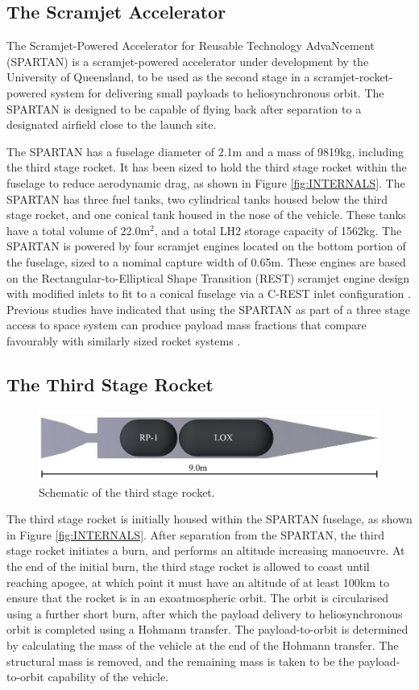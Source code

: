 \documentclass[]{aiaa-tc}
\begin{document}
\subsection{The Scramjet Accelerator}
The Scramjet-Powered Accelerator for Reusable Technology AdvaNcement (SPARTAN) is a scramjet-powered accelerator under development by the University of Queensland, to be used as the second stage in a scramjet-rocket-powered system for delivering small payloads to heliosynchronous orbit\cite{Preller2017}. The SPARTAN is designed to be capable of flying back after separation to a designated airfield close to the launch site.  

The SPARTAN has a fuselage diameter of 2.1m and a mass of 9819kg, including the third stage rocket. It has been sized to hold the third stage rocket within the fuselage to reduce aerodynamic drag, as shown in Figure \ref{fig:INTERNALS}. The SPARTAN has three fuel tanks, two cylindrical tanks housed below the third stage rocket, and one conical tank housed in the nose of the vehicle. These tanks have a total volume of 22.0m$^2$, and a total LH2 storage capacity of 1562kg. 
The SPARTAN is powered by four scramjet engines located on the bottom portion of the fuselage, sized to a nominal capture width of 0.65m. These engines are based on the Rectangular-to-Elliptical Shape Transition (REST) scramjet engine design \cite{Suraweera2009} with modified inlets to fit to a conical fuselage via a C-REST inlet configuration \cite{Gollan2010}. Previous studies have indicated that using the SPARTAN as part of a three stage access to space system can produce payload mass fractions that compare favourably with similarly sized rocket systems \cite{Preller2015a,Preller2017}. 


\subsection{The Third Stage Rocket}\label{section:rocket}
\begin{figure}[ht]
	\centering
	\includegraphics[width=0.6\linewidth]{3rdStage}
	\caption{Schematic of the third stage rocket.}
	\label{fig:ThirdStage}
\end{figure}

The third stage rocket is initially housed within the SPARTAN fuselage, as shown in Figure \ref{fig:INTERNALS}. After separation from the SPARTAN, the third stage rocket initiates a burn, and performs an altitude increasing manoeuvre. 
At the end of the initial burn, the third stage rocket is allowed to coast until reaching apogee, at which point it must have an altitude of at least 100km to ensure that the rocket is in an exoatmospheric orbit. The orbit is circularised using a further short burn, after which the payload delivery to heliosynchronous orbit is completed using a Hohmann transfer. The payload-to-orbit is determined by calculating the mass of the vehicle at the end of the Hohmann transfer. The structural mass is removed, and the remaining mass is taken to be the payload-to-orbit capability of the vehicle. 
\end{document}
